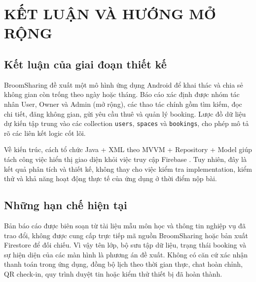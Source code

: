 \chapstart
\section{KẾT LUẬN VÀ HƯỚNG MỞ RỘNG}
\subsection{Kết luận của giai đoạn thiết kế}
BroomSharing đề xuất một mô hình ứng dụng Android để khai thác và chia sẻ không gian còn trống theo ngày hoặc tháng. Báo cáo xác định được nhóm tác nhân User, Owner và Admin (mở rộng), các thao tác chính gồm tìm kiếm, đọc chi tiết, đăng không gian, gửi yêu cầu thuê và quản lý booking. Lược đồ dữ liệu dự kiến tập trung vào các collection \texttt{users}, \texttt{spaces} và \texttt{bookings}, cho phép mô tả rõ các liên kết logic cốt lõi.

Về kiến trúc, cách tổ chức Java + XML theo MVVM + Repository + Model giúp tách công việc hiển thị giao diện khỏi việc truy cập Firebase \parencite{android_arch,android_data}. Tuy nhiên, đây là kết quả phân tích và thiết kế, không thay cho việc kiểm tra implementation, kiểm thử và khả năng hoạt động thực tế của ứng dụng ở thời điểm nộp bài.

\subsection{Những hạn chế hiện tại}
Bản báo cáo được biên soạn từ tài liệu mẫu môn học và thông tin nghiệp vụ đã trao đổi, không được cung cấp trực tiếp mã nguồn BroomSharing hoặc bản xuất Firestore để đối chiếu. Vì vậy tên lớp, bộ sưu tập dữ liệu, trạng thái booking và sự hiện diện của các màn hình là phương án đề xuất. Không có căn cứ xác nhận thanh toán trong ứng dụng, đồng bộ lịch theo thời gian thực, chat hoàn chỉnh, QR check-in, quy trình duyệt tin hoặc kiểm thử thiết bị đã hoàn thành.

